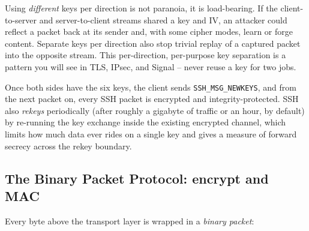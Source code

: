 \begin{trapbox}
Using \emph{different} keys per direction is not paranoia, it is load-bearing. If the client-to-server and server-to-client streams shared a key and IV, an attacker could reflect a packet back at its sender and, with some cipher modes, learn or forge content. Separate keys per direction also stop trivial replay of a captured packet into the opposite stream. This per-direction, per-purpose key separation is a pattern you will see in TLS, IPsec, and Signal -- never reuse a key for two jobs.
\end{trapbox}

Once both sides have the six keys, the client sends \texttt{SSH\_MSG\_NEWKEYS}, and from the next packet on, every SSH packet is encrypted and integrity-protected. SSH also \emph{rekeys} periodically (after roughly a gigabyte of traffic or an hour, by default) by re-running the key exchange inside the existing encrypted channel, which limits how much data ever rides on a single key and gives a measure of forward secrecy across the rekey boundary.

\subsection{The Binary Packet Protocol: encrypt and MAC}

Every byte above the transport layer is wrapped in a \emph{binary packet}:

\begin{center}
\end{center}


